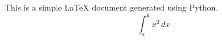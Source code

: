 \documentclass{article}
\begin{document}
This is a simple LaTeX document generated using Python.
$$
\int_{a}^{b} x^2 \, dx
$$
\end{document}
